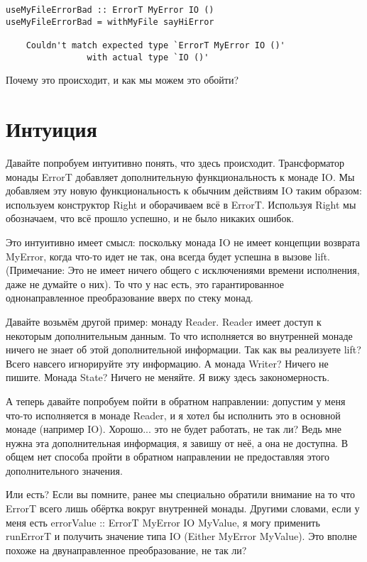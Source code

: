 \begin{lstlisting}
useMyFileErrorBad :: ErrorT MyError IO ()
useMyFileErrorBad = withMyFile sayHiError

    Couldn't match expected type `ErrorT MyError IO ()'
                with actual type `IO ()'
\end{lstlisting}

Почему это происходит, и как мы можем это обойти?

\section{Интуиция}
Давайте попробуем интуитивно понять, что здесь происходит. Трансформатор монады
ErrorT добавляет дополнительную функциональность к монаде IO. Мы добавляем эту
новую функциональность к обычним действиям IO таким образом: используем
конструктор Right и оборачиваем всё в ErrorT. Используя Right мы обозначаем,
что всё прошло успешно, и не было никаких ошибок.

Это интуитивно имеет смысл: поскольку монада IO не имеет концепции возврата
MyError, когда что-то идет не так, она всегда будет успешна в вызове lift.
(Примечание: Это не имеет ничего общего с исключениями времени исполнения, даже
не думайте о них). То что у нас есть, это гарантированное однонаправленное
преобразование вверх по стеку монад.

Давайте возьмём другой пример: монаду Reader. Reader имеет доступ к некоторым
дополнительным данным. То что исполняется во внутренней монаде ничего не знает
об этой дополнительной информации. Так как вы реализуете lift? Всего навсего
игнорируйте эту информацию. А монада Writer? Ничего не пишите. Монада State?
Ничего не меняйте. Я вижу здесь закономерность. 

А теперь давайте попробуем пойти в обратном направлении: допустим у меня что-то
исполняется в монаде Reader, и я хотел бы исполнить это в основной монаде
(например IO). Хорошо... это не будет работать, не так ли? Ведь мне нужна эта
дополнительная информация, я завишу от неё, а она не доступна. В общем нет
способа пройти в обратном направлении не предоставляя этого дополнительного
значения.

Или есть? Если вы помните, ранее мы специально обратили внимание на то что
ErrorT всего лишь обёртка вокруг внутренней монады. Другими словами, если у
меня есть errorValue :: ErrorT MyError IO MyValue, я могу применить runErrorT и
получить значение типа IO (Either MyError MyValue). Это вполне похоже на
двунаправленное преобразование, не так ли?

